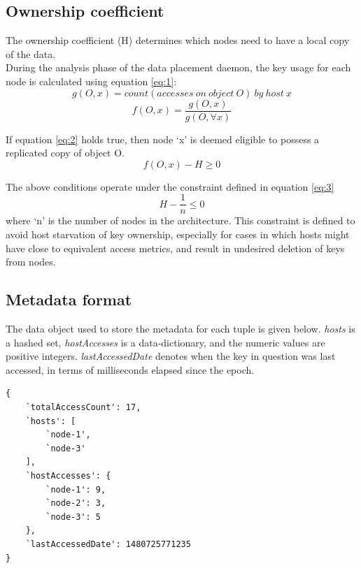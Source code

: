 \documentclass{sig-alternate}
\begin{document}
\subsection{Ownership coefficient}
The ownership coefficient (H) determines which nodes need to have a local copy of the data.\\

During the analysis phase of the data placement daemon, the key usage for each node is calculated using equation \ref{eq:1}:
\begin{equation*}g(O, x) = count(accesses\ on\ object\ O)\ by\ host\ x \end{equation*}
\begin{equation} \label{eq:1} f(O,x) = \frac{g(O, x)}{g(O, \forall x)} \end{equation}

If equation \ref{eq:2} holds true, then node `x' is deemed eligible to possess a replicated copy of object O.
\begin{equation} \label{eq:2} f(O, x) - H \geq 0 \end{equation}

The above conditions operate under the constraint defined in equation \ref{eq:3}
\begin{equation} \label{eq:3} H - \frac{1}{n} \leq 0 \end{equation}
where `n' is the number of nodes in the architecture. This constraint is defined to avoid host starvation of key ownership, especially for cases in which hosts might have close to equivalent access metrics, and result in undesired deletion of keys from nodes.\\


\subsection{Metadata format}
The data object used to store the metadata for each tuple is given below. \textit{hosts} is a hashed set, \textit{hostAccesses} is a data-dictionary, and the numeric values are positive integers. \textit{lastAccessedDate} denotes when the key in question was last accessed, in terms of milliseconds elapsed since the epoch.\\
\begin{lstlisting}
{
    `totalAccessCount': 17,
    `hosts': [
        `node-1',
        `node-3'
    ],
    `hostAccesses': {
        `node-1': 9,
        `node-2': 3,
        `node-3': 5
    },
    `lastAccessedDate': 1480725771235
}
\end{lstlisting}
\end{document}
